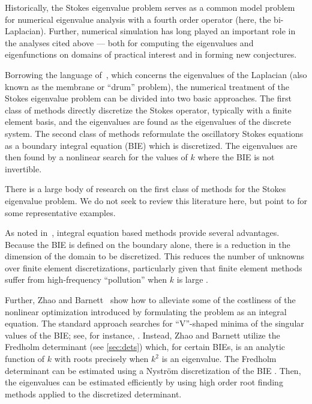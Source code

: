 Historically, the Stokes eigenvalue problem serves as a
common model problem for numerical eigenvalue analysis
with a fourth order operator (here, the bi-Laplacian).
%
Further, numerical simulation has long played an
important role in the analyses cited above --- both for
computing the eigenvalues and eigenfunctions
on domains of practical interest and in forming
new conjectures.

Borrowing the language of~\cite{zhao2015robust},
which concerns the eigenvalues of the Laplacian
(also known as the membrane or ``drum'' problem),
the numerical treatment of the Stokes eigenvalue
problem can be divided into two basic approaches.
%
The first class of methods
directly discretize the
Stokes operator, typically with a
finite element basis, and the eigenvalues are found
as the eigenvalues of the discrete system.
%
The second class of methods reformulate the 
oscillatory Stokes equations as a boundary integral
equation (BIE) which is discretized.
The eigenvalues are then found
by a nonlinear search for the values of
$k$ where the BIE is not invertible.
%

There is a large body of research on the first class of methods
for the Stokes eigenvalue problem.
%
We do not seek to review this literature here,
but point to \cite{johnson1974beam,
  rannacher1979nonconforming,
  mercier1981eigenvalue,bjorstad1999high,
  jia2009approximation,chen2006approximation,
  lovadina2009posteriori,huang2011numerical,
  carstensen2014guaranteed}
for some representative examples.

As noted in~\cite{zhao2015robust}, integral
equation based methods provide several advantages.
%
Because the BIE is defined on the
boundary alone, there is a reduction in the
dimension of the domain to be discretized.
%
This reduces the number of unknowns over finite
element discretizations, particularly given
that finite element methods suffer from
high-frequency ``pollution'' when $k$ is large
\cite{babuska1997pollution}.

Further, Zhao and Barnett~\cite{zhao2015robust}
show how to alleviate some of the costliness of the
nonlinear optimization introduced by formulating the 
problem as an integral equation.
%
The standard approach searches for ``V''-shaped minima
of the singular values of the BIE; see, for
instance, \cite{trefethen2006computed}.
%
Instead, Zhao and Barnett utilize the Fredholm
determinant (see \cref{sec:dets}) which, for certain
BIEs, is an analytic function of $k$ with roots
precisely when $k^2$ is an eigenvalue.
%
The Fredholm determinant can be estimated using
a Nystr\"{o}m discretization of the BIE
\cite{bornemann2010numerical,zhao2015robust}.
%
Then, the eigenvalues can be estimated efficiently
by using high order root finding methods applied
to the discretized determinant.


